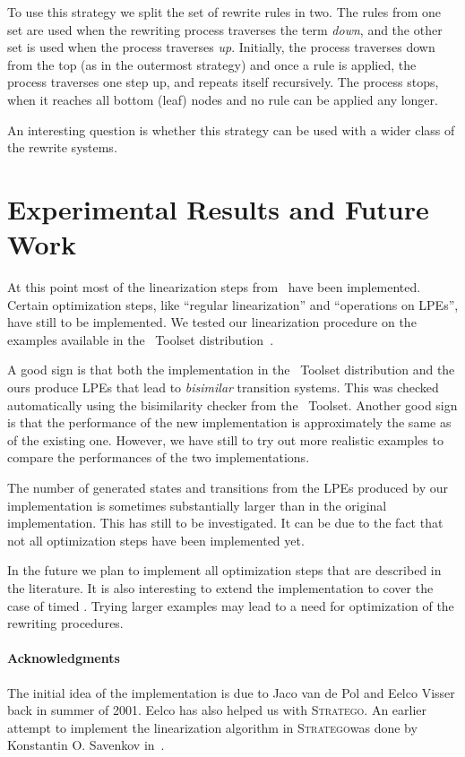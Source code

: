 \documentclass{article}
\newcommand{\stratego}{\textsc{Stratego}}
\begin{document}
To use this strategy we split the set of rewrite rules in two. The
rules from one set are used when the rewriting process traverses the
term \emph{down}, and the other set is used when the process traverses
\emph{up}. Initially, the process traverses down from the top (as in
the outermost strategy) and once a rule is applied, the process
traverses one step up, and repeats itself recursively. The process
stops, when it reaches all bottom (leaf) nodes and no rule can be
applied any longer.

An interesting question is whether this strategy can be used with a
wider class of the rewrite systems.

\section{Experimental Results and Future Work}
At this point most of the linearization steps from~\cite{Use02} have
been implemented. Certain optimization steps, like ``regular
linearization'' and ``operations on LPEs'', have still to be
implemented. We tested our linearization procedure on the examples
available in the \mcrl\ Toolset distribution~\cite{Wou01}.

A good sign is that both the implementation in the \mcrl\ Toolset
distribution and the ours produce LPEs that lead to \emph{bisimilar}
transition systems. This was checked automatically using the
bisimilarity checker from the \mcrl\ Toolset. Another good sign is
that the performance of the new implementation is approximately the
same as of the existing one. However, we have still to try out more
realistic examples to compare the performances of the two
implementations.

The number of generated states and transitions from the LPEs produced
by our implementation is sometimes substantially larger than in the
original implementation. This has still to be investigated.  It can be
due to the fact that not all optimization steps have been implemented
yet.

In the future we plan to implement all optimization steps that are
described in the literature. It is also interesting to extend the
implementation to cover the case of timed \mcrl.  Trying larger
examples may lead to a need for optimization of the rewriting
procedures.

\paragraph{Acknowledgments}
The initial idea of the implementation is due to Jaco van de Pol and
Eelco Visser back in summer of 2001. Eelco has also helped us with
\stratego. An earlier attempt to implement the linearization algorithm
in \stratego was done by Konstantin O.  Savenkov in~\cite{Sav02}.



\end{document}
